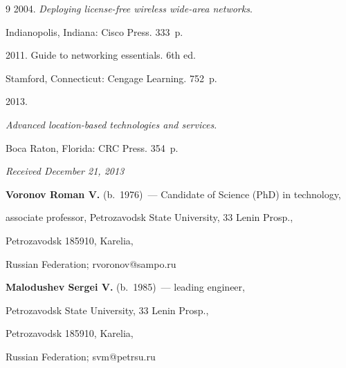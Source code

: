 {{\begin{thebibliography}{9}
 2004. \textit{Deploying license-free wireless wide-area networks}.

Indianopolis, Indiana:  Cisco Press.  333~p. 


 2011. Guide to networking essentials. 6th ed.

Stamford, Connecticut: Cengage Learning. 752~p. 


 2013.

\textit{Advanced location-based technologies and services}.

Boca Raton, Florida: CRC Press. 354~p. 

 \end{thebibliography}

} }



\vspace*{-6pt}



\hfill{\small\textit{Received December 21, 2013}}



\vspace*{-6pt}



\Contr



\noindent

\textbf{Voronov Roman V.} (b.\ 1976)~--- Candidate of Science (PhD) in technology,

associate professor, Petrozavodsk State University, 33 Lenin Prosp.,

Petrozavodsk 185910, Karelia,

Russian Federation; rvoronov@sampo.ru



\vspace*{3pt}



\noindent

\textbf{Malodushev Sergei V.} (b.\ 1985)~--- leading engineer,

Petrozavodsk State University, 33 Lenin Prosp.,

Petrozavodsk 185910, Karelia,

Russian Federation; svm@petrsu.ru







\label{end\stat}



\renewcommand{\bibname}{\protect\rmfamily Литература}

